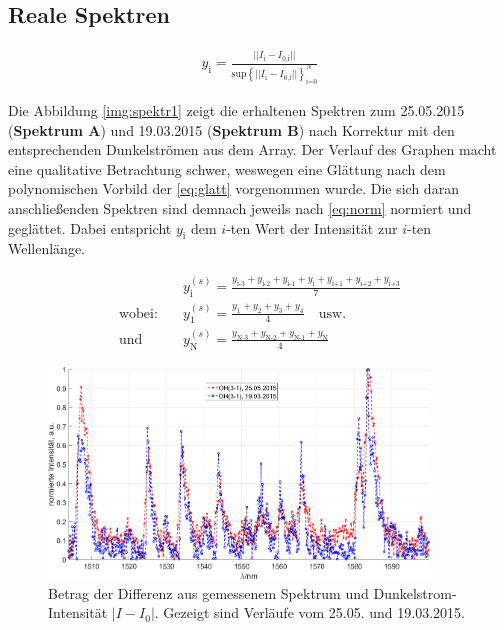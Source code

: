 \documentclass[numbers=noenddot,a4paper,notitlepage,twoside,BCOR15mm]{scrartcl}
\newcommand{\ix}[1]{_\text{#1}}
\newcommand{\fett}[1]{\textbf{#1}}
\begin{document}
	\subsection{Reale Spektren}
	
	\begin{align}
	y\ix{i}=\frac{||I\ix{i}-I\ix{0,i}||}{\text{sup}\left\lbrace ||I\ix{i}-I\ix{0,i}||\right\rbrace\ix{i=0}^{N}} \label{eq:norm}
	\end{align}
	
	Die Abbildung \autoref{img:spektr1} zeigt die erhaltenen Spektren zum  25.05.2015 (\fett{Spektrum A}) und 19.03.2015 (\fett{Spektrum B}) nach Korrektur mit den entsprechenden Dunkelströmen aus dem Array. Der Verlauf des Graphen macht eine qualitative Betrachtung schwer, weswegen eine Glättung nach dem polynomischen Vorbild der \autoref{eq:glatt} vorgenommen wurde. Die sich daran anschließenden Spektren sind demnach jeweils nach \autoref{eq:norm} normiert und geglättet. Dabei entspricht $y\ix{i}$ dem $i$-ten Wert der Intensität zur $i$-ten Wellenlänge.
	
	\begin{align}
	&y^{(s)}\ix{i}=\frac{y\ix{i-3}+y\ix{i-2}+y\ix{i-1}+y\ix{i}+y\ix{i+1}+y\ix{i+2}+y\ix{i+3}}{7} \label{eq:glatt} \\
	\text{wobei:} \quad &y^{(s)}\ix{1}=\frac{y\ix{1}+y\ix{2}+y\ix{3}+y\ix{4}}{4} \quad \text{usw.} \nonumber\\
	\text{und} \quad &y^{(s)}\ix{N}=\frac{y\ix{N-3}+y\ix{N-2}+y\ix{N-1}+y\ix{N}}{4} \nonumber
	\end{align}
	
	\begin{figure}[h]
		\centering
		\includegraphics[width=0.9\textwidth]{spektr_unsmooth.png}
		\caption{Betrag der Differenz aus gemessenem Spektrum und Dunkelstrom-Intensität $|I-I\ix{0}|$. Gezeigt sind Verläufe vom 25.05. und 19.03.2015.}
		\label{img:spektr1}
	\end{figure}
	
\end{document}
